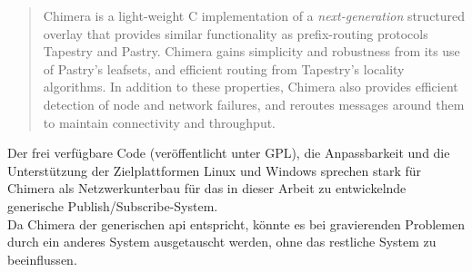 \begin{quote}
Chimera is a light-weight C implementation of a \emph{next-generation} structured overlay that provides similar functionality as prefix-routing protocols Tapestry and Pastry.  Chimera gains simplicity and robustness from its use of Pastry's leafsets, and efficient routing from Tapestry's locality algorithms.  In addition to these properties, Chimera also provides efficient detection of node and network failures, and reroutes messages around them to maintain connectivity and throughput.  
\end{quote}

Der frei verfügbare Code (veröffentlicht unter GPL), die Anpassbarkeit und die Unterstützung der Zielplattformen Linux und Windows sprechen stark für Chimera als Netzwerkunterbau für das in dieser Arbeit zu entwickelnde generische Publish/Subscribe-System.\\
Da Chimera der generischen \ac{api} entspricht, könnte es bei gravierenden Problemen durch ein anderes System ausgetauscht werden, ohne das restliche System zu beeinflussen.
